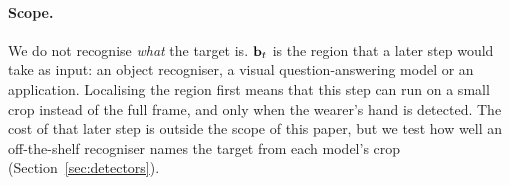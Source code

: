 \paragraph{Scope.} We do not recognise \emph{what} the target is. $\mathbf{b}_t$ is the region that a later step would take as input: an object recogniser, a visual question-answering model or an application. Localising the region first means that this step can run on a small crop instead of the full frame, and only when the wearer's hand is detected. The cost of that later step is outside the scope of this paper, but we test how well an off-the-shelf recogniser names the target from each model's crop (Section~\ref{sec:detectors}).
